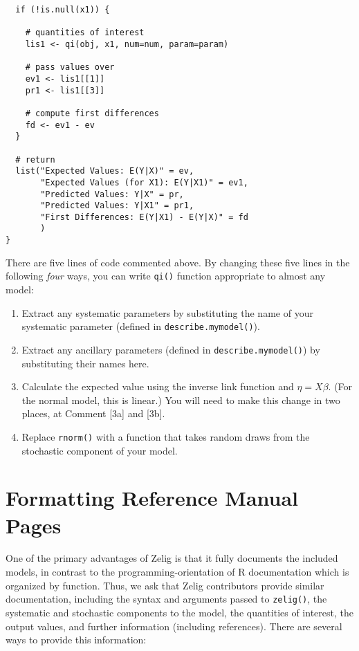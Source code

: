 \begin{description}
\begin{verbatim}
  if (!is.null(x1)) {

    # quantities of interest
    lis1 <- qi(obj, x1, num=num, param=param)

    # pass values over
    ev1 <- lis1[[1]]
    pr1 <- lis1[[3]]

    # compute first differences
    fd <- ev1 - ev
  }

  # return
  list("Expected Values: E(Y|X)" = ev,
       "Expected Values (for X1): E(Y|X1)" = ev1,
       "Predicted Values: Y|X" = pr,
       "Predicted Values: Y|X1" = pr1,
       "First Differences: E(Y|X1) - E(Y|X)" = fd                                                                                                                                               
       )
}

\end{verbatim}

There are five lines of code commented above.  By changing these five lines in the following \emph{four} ways, you can write {\tt qi()} function appropriate to almost any model:  

\begin{enumerate}  
	\item Extract any systematic parameters by substituting the name of your systematic parameter (defined in {\tt describe.mymodel()}).   

	\item Extract any ancillary parameters (defined in {\tt describe.mymodel()}) by substituting their names here.  

	\item Calculate the expected value using the inverse link function and $\eta = X \beta$.  (For the normal model, this is linear.)  You will need to make this change in two places, at Comment [3a] and [3b].

	\item Replace {\tt rnorm()} with a function that takes random draws from the stochastic component of your model.  
\end{enumerate}




\section{Formatting Reference Manual Pages}  \label{s:format}

One of the primary advantages of Zelig is that it fully documents the included models, in contrast to the programming-orientation of R documentation which is organized by function.  Thus, we ask that Zelig contributors provide similar documentation, including the syntax and arguments passed to {\tt zelig()}, the systematic and stochastic components to the model, the quantities of interest, the output values, and further information (including references).  There are several ways to provide this information:  



\end{description}
